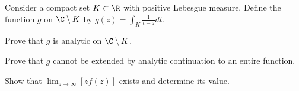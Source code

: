 Consider a compact set $K\subset \R$ with positive Lebesgue measure.
Define the function $g$ on $\C \setminus K$ by
$g(z)=\int_K\frac{1}{t-z}dt$.
\begin{alist}
\item Prove that $g$ is analytic on $\C \setminus K$.
\item Prove that $g$ cannot be extended by analytic continuation to an
entire function.
\item Show that $\lim_{z\rightarrow \infty}[zf(z)]$ exists and
determine its value.
\end{alist}

